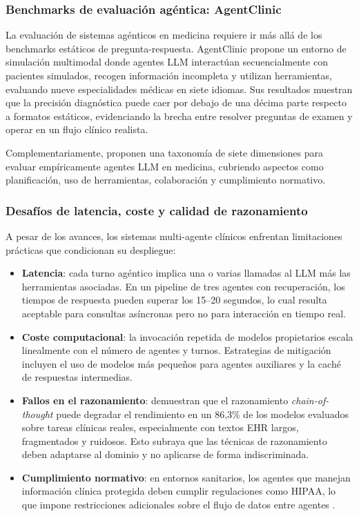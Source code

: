 \subsubsection{Benchmarks de evaluación agéntica: AgentClinic}

La evaluación de sistemas agénticos en medicina requiere ir más allá de los benchmarks estáticos de pregunta-respuesta. AgentClinic \parencite{AgentClinic2025} propone un entorno de simulación multimodal donde agentes \ac{LLM} interactúan secuencialmente con pacientes simulados, recogen información incompleta y utilizan herramientas, evaluando nueve especialidades médicas en siete idiomas. Sus resultados muestran que la precisión diagnóstica puede caer por debajo de una décima parte respecto a formatos estáticos, evidenciando la brecha entre resolver preguntas de examen y operar en un flujo clínico realista.

Complementariamente, \textcite{Vatsal2026AgenticTaxonomy} proponen una taxonomía de siete dimensiones para evaluar empíricamente agentes \ac{LLM} en medicina, cubriendo aspectos como planificación, uso de herramientas, colaboración y cumplimiento normativo.

\subsubsection{Desafíos de latencia, coste y calidad de razonamiento}

A pesar de los avances, los sistemas multi-agente clínicos enfrentan limitaciones prácticas que condicionan su despliegue:

\begin{itemize}[nosep, leftmargin=*]
    \item \textbf{Latencia}: cada turno agéntico implica una o varias llamadas al \ac{LLM} más las herramientas asociadas. En un pipeline de tres agentes con recuperación, los tiempos de respuesta pueden superar los 15--20 segundos, lo cual resulta aceptable para consultas asíncronas pero no para interacción en tiempo real.
    \item \textbf{Coste computacional}: la invocación repetida de modelos propietarios escala linealmente con el número de agentes y turnos. Estrategias de mitigación incluyen el uso de modelos más pequeños para agentes auxiliares y la caché de respuestas intermedias.
    \item \textbf{Fallos en el razonamiento}: \textcite{Wu2025CoTFails} demuestran que el razonamiento \emph{chain-of-thought} puede degradar el rendimiento en un 86,3\% de los modelos evaluados sobre tareas clínicas reales, especialmente con textos \ac{EHR} largos, fragmentados y ruidosos. Esto subraya que las técnicas de razonamiento deben adaptarse al dominio y no aplicarse de forma indiscriminada.
    \item \textbf{Cumplimiento normativo}: en entornos sanitarios, los agentes que manejan información clínica protegida deben cumplir regulaciones como \ac{HIPAA}, lo que impone restricciones adicionales sobre el flujo de datos entre agentes \parencite{Neupane2025HIPAA}.
\end{itemize}

